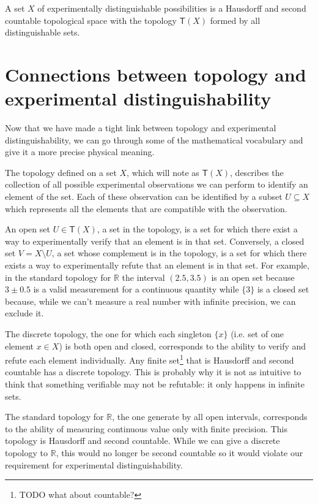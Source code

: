 \documentclass[11pt,letterpaper,fleqn]{memoir} %
\begin{document}
\begin{prop}
	A set $X$ of experimentally distinguishable  possibilities is a Hausdorff and second countable topological space with the topology $\mathsf{T}(X)$ formed by all distinguishable sets.
\end{prop}

\section{Connections between topology and experimental distinguishability}

Now that we have made a tight link between topology and experimental distinguishability, we can go through some of the mathematical vocabulary and give it a more precise physical meaning.

The topology defined on a set $X$, which will note as $\mathsf{T}(X)$, describes the collection of all possible experimental observations we can perform to identify an element of the set. Each of these observation can be identified by a subset $U \subseteq X$ which represents all the elements that are compatible with the observation.

An open set $U \in \mathsf{T}(X)$, a set in the topology, is a set for which there exist a way to  experimentally verify that an element is in that set. Conversely, a closed set $V = X \setminus U $, a set whose complement is in the topology, is a set for which there exists a way to experimentally refute that an element is in that set. For example, in the standard topology for $\mathbb{R}$ the interval $(2.5, 3.5)$ is an open set because $3 \pm 0.5$ is a valid measurement for a continuous quantity while $\{3\}$ is a closed set because, while we can't measure a real number with infinite precision, we can exclude it.

The discrete topology, the one for which each singleton $\{x\}$ (i.e. set of one element $x \in X$) is both open and closed, corresponds to the ability to verify and refute each element individually. Any finite set\footnote{TODO what about countable?} that is Hausdorff and second countable has a discrete topology. This is probably why it is not as intuitive to think that something verifiable may not be refutable: it only happens in infinite sets.

The standard topology for $\mathbb{R}$, the one generate by all open intervals, corresponds to the ability of measuring continuous value only with finite precision. This topology is Hausdorff and second countable. While we can give a discrete topology to $\mathbb{R}$, this would no longer be second countable so it would violate our requirement for experimental distinguishability.
\end{document}
